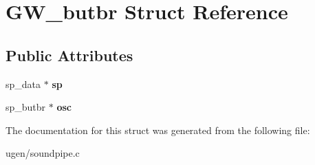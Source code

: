 \hypertarget{structGW__butbr}{}\section{G\+W\+\_\+butbr Struct Reference}
\label{structGW__butbr}
\subsection*{Public Attributes}
\begin{DoxyCompactItemize}
\item 
\hypertarget{structGW__butbr_a5fd16639c45e1b619c46216901eaf291}{}\label{structGW__butbr_a5fd16639c45e1b619c46216901eaf291} 
sp\+\_\+data $\ast$ {\bfseries sp}
\item 
\hypertarget{structGW__butbr_a2f3e894493d9519d2bd4524808166157}{}\label{structGW__butbr_a2f3e894493d9519d2bd4524808166157} 
sp\+\_\+butbr $\ast$ {\bfseries osc}
\end{DoxyCompactItemize}


The documentation for this struct was generated from the following file\+:\begin{DoxyCompactItemize}
\item 
ugen/soundpipe.\+c\end{DoxyCompactItemize}
